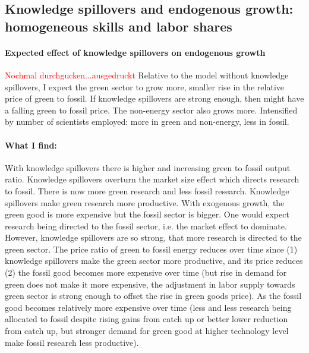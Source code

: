 \documentclass[12pt]{article}
\newcommand{\tr}[1]{\textcolor{red}{#1}}
\begin{document}
\clearpage
\newpage

\subsection{Knowledge spillovers and endogenous growth: homogeneous skills and labor shares}
\paragraph{Expected effect of knowledge spillovers on endogenous growth}
\tr{Nochmal durchgucken...ausgedruckt}
Relative to the model without knowledge spillovers, I expect the green sector to grow more, smaller rise in the relative price of green to fossil. If knowledge spillovers are strong enough, then might have a falling green to fossil price. The non-energy sector also grows more. Intensified by number of scientists employed: more in green and non-energy, less in fossil. %

\paragraph{What I find:} With knowledge spillovers there is higher and increasing green to fossil output ratio. Knowledge spillovers overturn the market size effect which directs research to fossil. There is now more green research and less fossil research. Knowledge spillovers make green research more productive. With exogenous growth, the green good is more expensive but the fossil sector is bigger. One would expect research being directed to the fossil sector, i.e. the market effect to dominate. However, knowledge spillovers are so strong, that more research is directed to the green sector.  The price ratio of green to fossil energy reduces over time since (1) knowledge spillovers make the green sector more productive, and its price reduces (2) the fossil good becomes more expensive over time (but rise in demand for green does not make it more expensive, the adjustment in labor supply towards green sector is strong enough to offset the rise in green goods price). As the fossil good becomes relatively more expensive over time (less and less research being allocated to fossil despite rising gains from catch up or better lower reduction from catch up, but stronger demand for green good at higher technology level make fossil research less productive).
\end{document}
